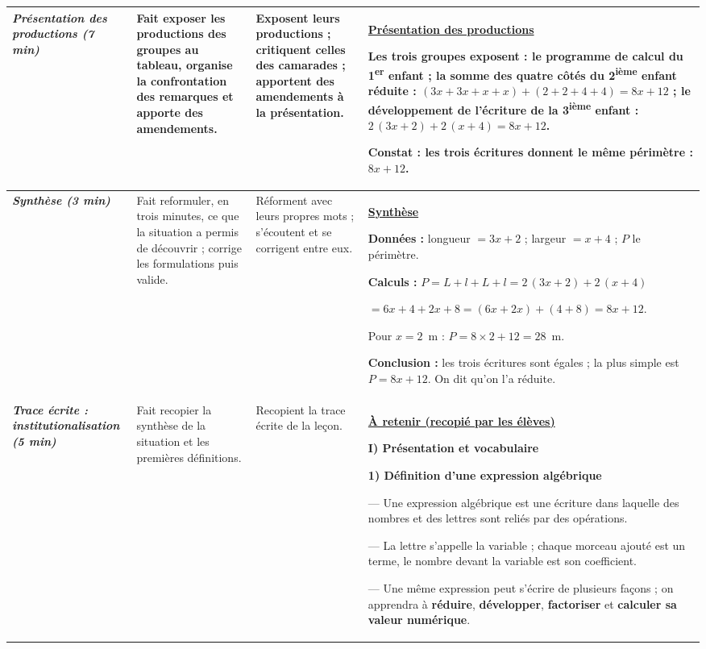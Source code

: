 \documentclass[10pt]{article}
\newcommand{\titreR}[1]{\underline{\textcolor{rougetitre}{\bfseries #1}}}
\newcommand{\moment}[1]{\textbf{\itshape #1}}
\newcommand{\mclef}[1]{\colorbox{jaunesurl}{#1}}
\newcommand{\ieme}{\textsuperscript{ième}}
\newcommand{\ier}{\textsuperscript{er}}
\begin{document}
\begin{longtable}{|p{2.35cm}|p{5.35cm}|p{4.55cm}|p{13.85cm}|}
\moment{Présentation des productions (7 min)} &
Fait exposer les productions des groupes au tableau, organise la confrontation des
remarques et apporte des amendements. &
Exposent leurs productions ; critiquent celles des camarades ; apportent des
amendements à la présentation. &
\titreR{Présentation des productions} \par
Les trois groupes exposent : le programme de calcul du 1\ier{} enfant ;
la somme des quatre côtés du 2\ieme{} enfant réduite :
$(3x+3x+x+x)+(2+2+4+4)=8x+12$ ; le développement de l'écriture de la 3\ieme{} enfant :
$2\,(3x+2)+2\,(x+4)=8x+12$. \par
\textbf{Constat :} les trois écritures donnent le même périmètre : $8x+12$. \\ \hline

\moment{Synthèse (3 min)} &
Fait reformuler, en trois minutes, ce que la situation a permis de découvrir ;
corrige les formulations puis valide. &
Réforment avec leurs propres mots ; s'écoutent et se corrigent entre eux. &
\titreR{Synthèse} \par
\textbf{Données :} longueur $=3x+2$ ; largeur $=x+4$ ; $P$ le périmètre. \par
\textbf{Calculs :} $P=L+l+L+l=2\,(3x+2)+2\,(x+4)$ \par
\hfill $=6x+4+2x+8=(6x+2x)+(4+8)=8x+12$. \par
Pour $x=2$~m : $P=8\times2+12=28$~m. \par
\textbf{Conclusion :} les trois écritures sont égales ; la plus simple est $P=8x+12$.
On dit qu'on l'a \mclef{réduite}. \\ \hline

\moment{Trace écrite : institutionalisation (5 min)} &
Fait recopier la synthèse de la situation et les premières définitions. &
Recopient la trace écrite de la leçon. &
\titreR{À retenir (recopié par les élèves)} \par
\textbf{I) Présentation et vocabulaire} \par
\textbf{1) Définition d'une expression algébrique} \par
— Une \mclef{expression algébrique} est une écriture dans laquelle des nombres et des
lettres sont reliés par des opérations. \par
— La lettre s'appelle la \mclef{variable} ; chaque morceau ajouté est un
\mclef{terme}, le nombre devant la variable est son \mclef{coefficient}. \par
— Une même expression peut s'écrire de plusieurs façons ; on apprendra à
\textbf{réduire}, \textbf{développer}, \textbf{factoriser} et \textbf{calculer sa
valeur numérique}. \\ \hline
\end{longtable}
\end{document}
